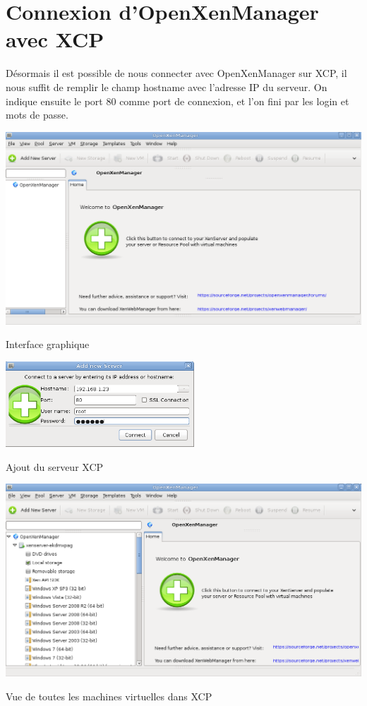 \section{Connexion d'OpenXenManager avec XCP}
Désormais il est possible de nous connecter avec OpenXenManager sur XCP, il nous suffit de remplir le champ hostname avec l'adresse IP du serveur.
On indique ensuite le port 80 comme port de connexion, et l'on fini par les login et mots de passe.
\begin{center}
\includegraphics[width=400pt]{images/xenmanager.png}
\end{center}
\begin{center}
Interface graphique
\end{center}
\begin{center}
\includegraphics[width=200pt]{images/addserveur.png}
\end{center}
\begin{center}
Ajout du serveur XCP
\end{center}
\begin{center}
\includegraphics[width=400pt]{images/final.png}
\end{center}
\begin{center}
Vue de toutes les machines virtuelles dans XCP
\end{center}

